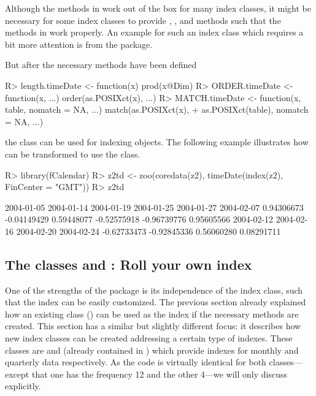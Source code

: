 \documentclass{Z}
\begin{document}
Although the methods in  work out of the box for many index classes,
it might be necessary for some index classes to provide , ,
 and  methods such that the methods in  
work properly. An example for such an index class which requires a bit more
attention is  from the  package.

But after the necessary methods have been defined
\begin{Schunk}
\begin{Sinput}
R> length.timeDate <- function(x) prod(x@Dim)
R> ORDER.timeDate <- function(x, ...) order(as.POSIXct(x), ...)
R> MATCH.timeDate <- function(x, table, nomatch = NA, ...) match(as.POSIXct(x), 
+     as.POSIXct(table), nomatch = NA, ...)
\end{Sinput}
\end{Schunk}
the class  can be used for indexing  objects.
The following example illustrates how  can be transformed
to use the  class.
\begin{Schunk}
\begin{Sinput}
R> library(fCalendar)
R> z2td <- zoo(coredata(z2), timeDate(index(z2), FinCenter = "GMT"))
R> z2td
\end{Sinput}
\begin{Soutput}
 2004-01-05  2004-01-14  2004-01-19  2004-01-25  2004-01-27  2004-02-07 
 0.94306673 -0.04149429  0.59448077 -0.52575918 -0.96739776  0.95605566 
 2004-02-12  2004-02-16  2004-02-20  2004-02-24 
-0.62733473 -0.92845336  0.56060280  0.08291711 
\end{Soutput}
\end{Schunk}

\subsection[The classes "yearmon" and "yearqtr": Roll your own index]{The classes  and : Roll your own index}
\label{sec:yearmon}

One of the strengths of the  package is its independence of the
index class, such that the index can be easily customized. The previous section
already explained how an existing class () can be used as
the index if the necessary methods are created. This section has a similar
but slightly different focus: it describes how new index classes can be created
addressing a certain type of indexes. These classes are  and
 (already contained in ) which provide indexes for
monthly and quarterly data respectively.
As the code is virtually identical for both classes---except that one has the 
frequency 12 and the other 4---we will only discuss  explicitly.
\end{document}
